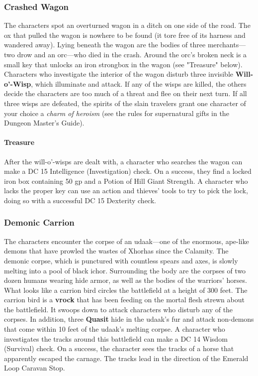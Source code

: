\documentclass[10pt,a4,twoside,twocolumn,openany,nodeprecatedcode]{dndbook}
\begin{document}
\subsubsection{Crashed Wagon}
The characters spot an overturned wagon in a ditch on one side of the road. The ox that pulled the wagon is nowhere to be found (it tore free of its harness and wandered away). Lying beneath the wagon are the bodies of three merchants—two drow and an orc—who died in the crash. Around the orc's broken neck is a small key that unlocks an iron strongbox in the wagon (see "Treasure" below).
Characters who investigate the interior of the wagon disturb three invisible \textbf{Will-o'-Wisp}, which illuminate and attack. If any of the wisps are killed, the others decide the characters are too much of a threat and flee on their next turn. If all three wisps are defeated, the spirits of the slain travelers grant one character of your choice a \textit{charm of heroism} (see the rules for supernatural gifts in the Dungeon Master's Guide).
\paragraph{Treasure}
After the will-o'-wisps are dealt with, a character who searches the wagon can make a DC 15 Intelligence (Investigation) check. On a success, they find a locked iron box containing 50 gp and a Potion of Hill Giant Strength. A character who lacks the proper key can use an action and thieves' tools to try to pick the lock, doing so with a successful DC 15 Dexterity check.
\subsubsection{Demonic Carrion}
The characters encounter the corpse of an udaak—one of the enormous, ape-like demons that have prowled the wastes of Xhorhas since the Calamity. The demonic corpse, which is punctured with countless spears and axes, is slowly melting into a pool of black ichor. Surrounding the body are the corpses of two dozen humans wearing hide armor, as well as the bodies of the warriors' horses. What looks like a carrion bird circles the battlefield at a height of 300 feet.
The carrion bird is a \textbf{vrock} that has been feeding on the mortal flesh strewn about the battlefield. It swoops down to attack characters who disturb any of the corpses. In addition, three \textbf{Quasit} hide in the udaak's fur and attack non-demons that come within 10 feet of the udaak's melting corpse.
A character who investigates the tracks around this battlefield can make a DC 14 Wisdom (Survival) check. On a success, the character sees the tracks of a horse that apparently escaped the carnage. The tracks lead in the direction of the Emerald Loop Caravan Stop.
\end{document}
